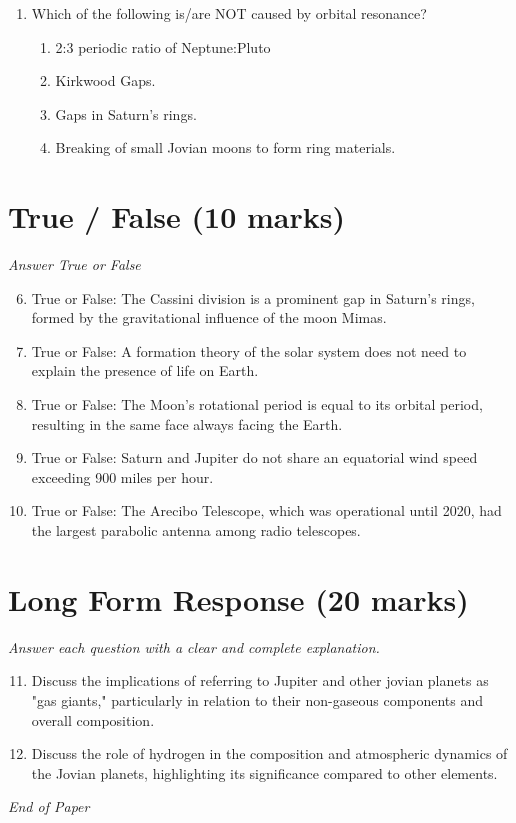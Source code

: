 \documentclass[12pt]{article}
\begin{document}
\begin{enumerate}[label=\arabic*.]
\begin{enumerate}[label=(\alph*)]
    \item size of the planet
    \item presence of an atmosphere
    \item distance from the sun
    \item rotation period
\end{enumerate}
\item Which of the following is/are NOT caused by orbital resonance?
\begin{enumerate}[label=(\alph*)]
    \item 2:3 periodic ratio of Neptune:Pluto
    \item Kirkwood Gaps.
    \item Gaps in Saturn's rings.
    \item Breaking of small Jovian moons to form ring materials.
\end{enumerate}
\end{enumerate}

\section*{True / False (10 marks)}
\textit{Answer True or False}
\begin{enumerate}[label=\arabic*.]
\setcounter{enumi}{5}
\item True or False: The Cassini division is a prominent gap in Saturn's rings, formed by the gravitational influence of the moon Mimas.
\item True or False: A formation theory of the solar system does not need to explain the presence of life on Earth.
\item True or False: The Moon's rotational period is equal to its orbital period, resulting in the same face always facing the Earth.
\item True or False: Saturn and Jupiter do not share an equatorial wind speed exceeding 900 miles per hour.
\item True or False: The Arecibo Telescope, which was operational until 2020, had the largest parabolic antenna among radio telescopes.
\end{enumerate}

\section*{Long Form Response (20 marks)}
\textit{Answer each question with a clear and complete explanation.}
\begin{enumerate}[label=\arabic*.]
\setcounter{enumi}{10}
\item Discuss the implications of referring to Jupiter and other jovian planets as "gas giants," particularly in relation to their non-gaseous components and overall composition.
\item Discuss the role of hydrogen in the composition and atmospheric dynamics of the Jovian planets, highlighting its significance compared to other elements.
\end{enumerate}

\vfill
\noindent\textit{End of Paper}
\end{document}
